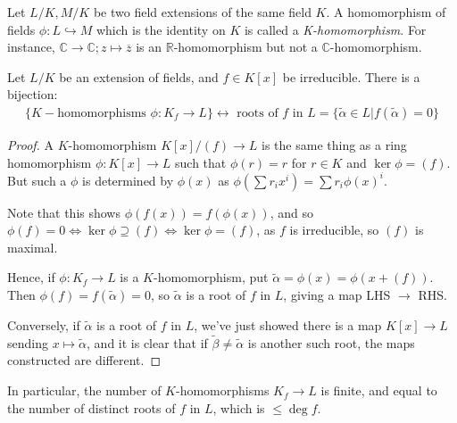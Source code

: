 \documentclass[a4paper, 10pt, twocolumn]{amsart}
\begin{document}
Let $L/K, M/K$ be two field extensions of the same field $K$. A homomorphism of fields $\phi:L\hookrightarrow M$ which is the identity on $K$ is called a \emph{K-homomorphism}. For instance, $\mathbb{C}\rightarrow \mathbb{C}; z\mapsto \overline{z}$ is an $\mathbb{R}$-homomorphism but not a $\mathbb{C}$-homomorphism.
\begin{lemma}
Let $L/K$ be an extension of fields, and $f\in K[x]$ be irreducible. There is a bijection:
\begin{align*}
\{K-\text{homomorphisms } \phi:K_f \rightarrow L\} \longleftrightarrow\text{ roots of $f$ in }L = \{\tilde{\alpha}\in L|f(\tilde{\alpha}) = 0 \}
\end{align*}
\end{lemma}
\begin{proof}
A $K$-homomorphism $K[x]/(f) \rightarrow L$ is the same thing as a ring homomorphism $\phi:K[x]\rightarrow L$ such that $\phi(r) = r$ for $r\in K$ and $\ker\phi = (f)$. But such a $\phi$ is determined by $\phi(x)$ as $\phi(\sum r_ix^i) = \sum r_i \phi(x)^i$.

Note that this shows $\phi(f(x)) = f(\phi(x))$, and so $\phi(f) = 0 \iff \ker \phi \supseteq (f) \iff \ker \phi = (f)$, as $f$ is irreducible, so $(f)$ is maximal.

Hence, if $\phi: K_f \rightarrow L$ is a $K$-homomorphism, put $\tilde{\alpha} = \phi(x) = \phi(x+(f))$. Then $\phi(f) = f(\tilde{\alpha}) = 0$, so $\tilde{\alpha}$ is a root of $f$ in $L$, giving a map LHS $\rightarrow$ RHS.

Conversely, if $\tilde{\alpha}$ is a root of $f$ in $L$, we've just showed there is a map $K[x]\rightarrow L$ sending $x\mapsto \tilde{\alpha}$, and it is clear that if $\tilde{\beta} \neq \tilde{\alpha}$ is another such root, the maps constructed are different.
\end{proof}
In particular, the number of $K$-homomorphisms $K_f\rightarrow L$ is finite, and equal to the number of distinct roots of $f$ in $L$, which is $\leq \deg f$.
\end{document}
